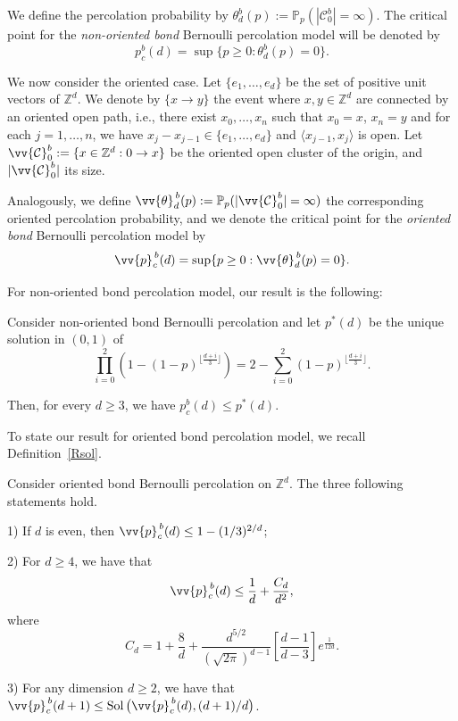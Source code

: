 \documentclass{aptpub}
\newcommand{\Z}{\mathbb{Z}}
\newcommand{\Pp}{\mathbb{P}}
\DeclareMathOperator{\Sol}{Sol}
\begin{document}
We define the percolation probability by $\theta^{b}_d(p) := \Pp_p(|\mathcal{C}^b_0|= \infty)$. The critical point for the {\it non-oriented bond} Bernoulli percolation model will be denoted by
 \begin{equation*} \label{eq:defCriticalPoint}
    p_c^{b}(d)=\sup\{p \geq 0 : \theta^b_d(p)=0\}.
\end{equation*}

We now consider the oriented case. Let $\{e_1, \dots, e_d\}$ be the set of positive unit vectors of $\Z^d$. We denote by $\{x \rightarrow y\}$ the event where  $x, y \in \Z^d$ are connected by an oriented open path, i.e., there exist $x_0, \dots, x_n$ such that $x_0 = x$, $x_n =y$ and for each $j=1, \dots, n$, we have $x_j - x_{j-1} \in \{e_1, \dots, e_d\}$ and $\langle x_{j-1}, x_j\rangle$ is open. Let $\vv{\mathcal{C}}^b_0 := \{ x \in \Z^d : 0 \rightarrow x\}$ be the oriented open cluster of the origin, and $|\vv{\mathcal{C}}^b_0|$ its size.

Analogously, we define 
$\vv{\theta}^{\, b}_d(p) :=  \Pp_p(|\vv{\mathcal{C}}^b_0|= \infty)$ the corresponding oriented percolation probability, and we denote the critical point for the {\it oriented bond} Bernoulli percolation model by \[\vv{p}_c^{\, b}(d)=\sup\{p \geq 0 : \vv{\theta}^{\,b}_d(p)=0\}.\]

For non-oriented bond percolation model, our result is the following:


\begin{thm}\label{theo:bounds} Consider non-oriented bond Bernoulli percolation and 
let $p^{\ast}(d)$ be the unique solution in $(0,1)$ of 
\begin{equation} \label{eq:Theorem1}
  \prod_{i=0}^2 \left(1-(1-p)^{\lfloor\frac{d+i}{3}\rfloor}\right)=2-\sum_{i=0}^2(1-p)^{\lfloor\frac{d+i}{3}\rfloor}.  
\end{equation}


Then, for every $d\geq 3$, we have $p_c^b(d) \leq p^{\ast}(d)$.
\end{thm}

To state our result for oriented bond percolation model, we recall Definition~\ref{Rsol}. 

\begin{thm}\label{theo:bondO}
Consider oriented bond Bernoulli percolation on $\Z^d$. The three following statements hold.

1) If $d$ is even, then $ \vv{p}^{\,b}_c(d)\leq 1-(1/3)^{2/d}$;


2) For $d \geq 4$, we have that \[\vv{p}^{\,b}_c(d)\leq \frac{1}{d}+\frac{C_d}{d^2},\]
where \[C_d=1+\frac{8}{d}+\frac{d^{5/2}}{(\sqrt{2\pi})^{d-1}}\left[\frac{d-1}{d-3}\right]e^{\frac{1}{12d}}.\]

3) For any dimension $d\geq 2$, we have that  $\vv{p}^{\,b}_c(d+1)\leq \Sol\big(\vv{p}^{\,b}_c(d), (d+1)/d \big)$.%

\end{thm}
\end{document}
